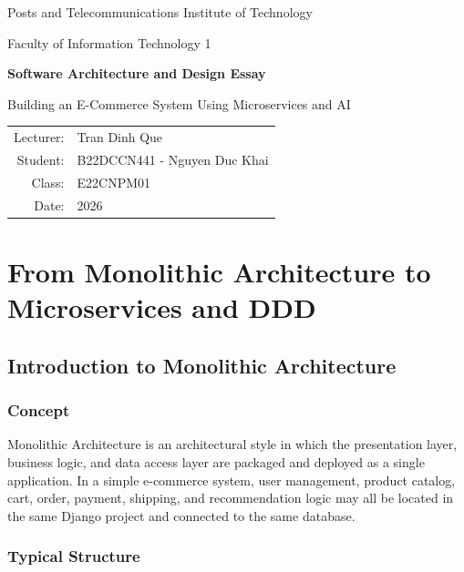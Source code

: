 \documentclass[12pt,a4paper]{article}
\begin{document}
\begin{titlepage}
\centering
{\Large Posts and Telecommunications Institute of Technology\par}
\vspace{0.5cm}
{\large Faculty of Information Technology 1\par}
\vspace{2cm}
{\LARGE\bfseries Software Architecture and Design Essay\par}
\vspace{0.5cm}
{\Large Building an E-Commerce System Using Microservices and AI\par}
\vfill
\begin{tabular}{rl}
Lecturer: & Tran Dinh Que\\
Student: & B22DCCN441 - Nguyen Duc Khai\\
Class: & E22CNPM01\\
Date: & 2026\\
\end{tabular}
\vfill
\end{titlepage}

\tableofcontents
\newpage
\listoffigures
\listoftables
\newpage

\section{From Monolithic Architecture to Microservices and DDD}

\subsection{Introduction to Monolithic Architecture}

\subsubsection{Concept}

Monolithic Architecture is an architectural style in which the presentation layer, business logic, and data access layer are packaged and deployed as a single application. In a simple e-commerce system, user management, product catalog, cart, order, payment, shipping, and recommendation logic may all be located in the same Django project and connected to the same database.

\subsubsection{Typical Structure}
\end{document}

